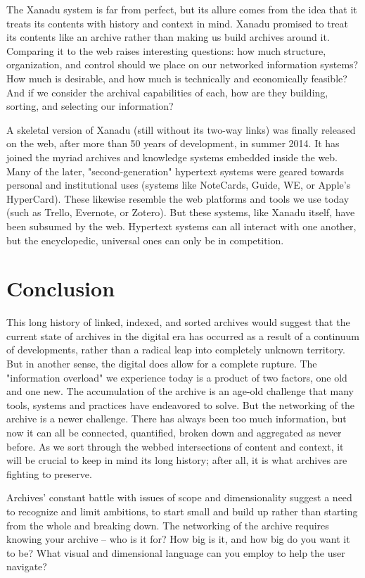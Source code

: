 The Xanadu system is far from perfect, but its allure comes from the idea that it treats its contents with history and context in mind. Xanadu promised to treat its contents like an archive rather than making us build archives around it. Comparing it to the web raises interesting questions: how much structure, organization, and control should we place on our networked information systems? How much is desirable, and how much is technically and economically feasible? And if we consider the archival capabilities of each, how are they building, sorting, and selecting our information?

A skeletal version of Xanadu (still without its two-way links) was finally released on the web, after more than 50 years of development, in summer 2014.  It has joined the myriad archives and knowledge systems embedded inside the web. Many of the later, "second-generation" hypertext systems were geared towards personal and institutional uses (systems like NoteCards, Guide, WE, or Apple's HyperCard). These likewise resemble the web platforms and tools we use today (such as Trello, Evernote, or Zotero).  But these systems, like Xanadu itself, have been subsumed by the web. Hypertext systems can all interact with one another, but the encyclopedic, universal ones can only be in competition.

\section{Conclusion}

This long history of linked, indexed, and sorted archives would suggest that the current state of archives in the digital era has occurred as a result of a continuum of developments, rather than a radical leap into completely unknown territory. But in another sense, the digital does allow for a complete rupture. The "information overload" we experience today is a product of two factors, one old and one new. The accumulation of the archive is an age-old challenge that many tools, systems and practices have endeavored to solve. But the networking of the archive is a newer challenge. There has always been too much information, but now it can all be connected, quantified, broken down and aggregated as never before. As we sort through the webbed intersections of content and context, it will be crucial to keep in mind its long history; after all, it is what archives are fighting to preserve.

Archives' constant battle with issues of scope and dimensionality suggest a need to recognize and limit ambitions, to start small and build up rather than starting from the whole and breaking down. The networking of the archive requires knowing your archive – who is it for? How big is it, and how big do you want it to be? What visual and dimensional language can you employ to help the user navigate?

